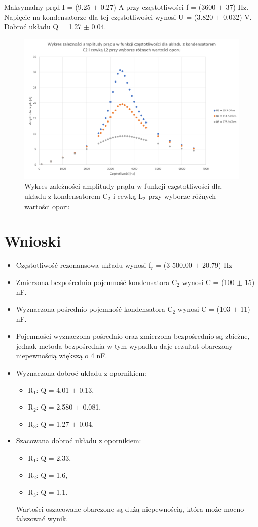 \documentclass[12pt, a4paper, oneside]{article}
\begin{document}
\begin{center}
Maksymalny prąd I = (9.25 $\pm$ 0.27) A przy częstotliwości f = (3600 $\pm$ 37) Hz.\\
Napięcie na kondensatorze dla tej częstotliwości wynosi U = (3.820 $\pm$ 0.032) V.\\
Dobroć układu Q = 1.27 $\pm$ 0.04.
\end{center}
\clearpage
\begin{figure}[h]
\centering
\caption{Wykres zależności amplitudy prądu w funkcji częstotliwości dla układu z kondensatorem C$_2$ i cewką L$_2$ przy wyborze różnych wartości oporu}
\includegraphics[scale=0.45]{f2.png}
\end{figure}
\section{Wnioski}
\begin{itemize}
\item Częstotliwość rezonansowa układu wynosi f$_r$ = (3 500.00 $\pm$ 20.79) Hz
\item Zmierzona bezpośrednio pojemność kondensatora C$_2$ wynosi C = (100 $\pm$ 15) nF.
\item Wyznaczona pośrednio pojemność kondensatora C$_2$ wynosi C = (103 $\pm$ 11) nF.
\item Pojemności wyznaczona pośrednio oraz zmierzona bezpośrednio są zbieżne, jednak metoda bezpośrednia w tym wypadku daje rezultat obarczony niepewnością większą o 4 nF.
\item Wyznaczona dobroć układu z opornikiem:
\begin{itemize}
\item R$_1$: Q = 4.01 $\pm$ 0.13,
\item R$_2$: Q = 2.580 $\pm$ 0.081,
\item R$_3$: Q = 1.27 $\pm$ 0.04.
\end{itemize}
\item Szacowana dobroć układu z opornikiem:
\begin{itemize}
\item R$_1$: Q = 2.33,
\item R$_2$: Q = 1.6,
\item R$_3$: Q = 1.1.
\end{itemize}
Wartości oszacowane obarczone są dużą niepewnością, która może mocno fałszować wynik.
\end{itemize}
\end{document}
